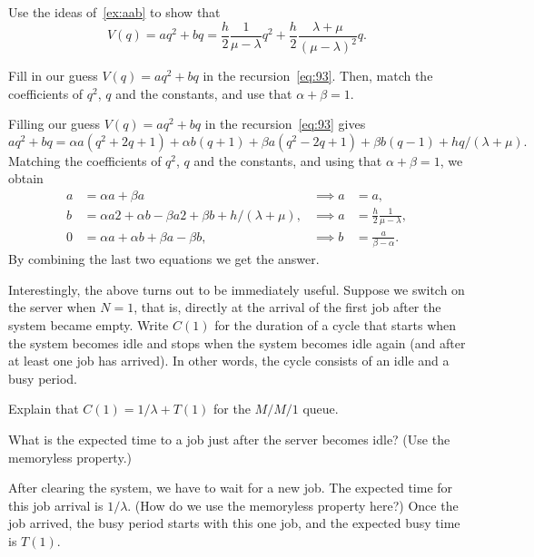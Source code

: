 \begin{exercise}
  Use the ideas of~\cref{ex:aab} to show that
  \begin{equation*}
    V(q) = a q^2 + b q = \frac h 2 \frac 1 {\mu -\lambda} q^2 + \frac h 2 \frac{\lambda + \mu}{(\mu - \lambda)^2}q.
  \end{equation*}

\begin{hint}
  Fill in our guess $V(q) = aq^2 + bq$ in the recursion~\cref{eq:93}.
  Then, match the coefficients of $q^2$, $q$ and the constants, and use that $\alpha + \beta = 1$.
\end{hint}

\begin{solution}
 Filling our guess $V(q) = aq^2 + bq$ in the recursion~\cref{eq:93}  gives
  \begin{equation*}
    aq^2 + b q = \alpha a (q^2 + 2q + 1) + \alpha b (q+1) + \beta a (q^2 - 2q + 1) + \beta b (q - 1) + hq/(\lambda + \mu). 
  \end{equation*}
  Matching the coefficients of $q^2$, $q$ and the constants, and using that $\alpha + \beta = 1$, we obtain
  \begin{align*}
    a &= \alpha a + \beta a &\implies a &= a, \\
    b &= \alpha a 2 + \alpha b - \beta a 2 + \beta b + h/(\lambda + \mu), & \implies a &= \frac h 2 \frac 1 {\mu -\lambda},\\
    0 &= \alpha a + \alpha b + \beta a - \beta b, & \implies b &= \frac a {\beta - \alpha}. 
  \end{align*}
By combining the last two equations we get the answer. 
\end{solution}
\end{exercise}


Interestingly, the above turns out to be immediately useful.
Suppose we switch on the server when $N=1$, that is, directly at the arrival of the first job after the system became empty.
Write $C(1)$ for the duration of a cycle that starts when the system becomes idle and stops when the system becomes idle again (and after at least one job has arrived).
In other words, the cycle consists of an idle and a busy period.

\begin{exercise}
Explain that $C(1)=1/\lambda + T(1)$ for the $M/M/1$ queue.
\begin{hint}
  What is the expected  time to a job just after the server becomes idle? (Use the memoryless property.)
\end{hint}
\begin{solution}
  After clearing the system, we have to wait for a new job.
  The expected time for this job arrival is $1/\lambda$.
  (How do we use the memoryless property here?)
  Once the job arrived, the busy period starts with this one job, and the expected busy time is $T(1)$.
\end{solution}
\end{exercise}

